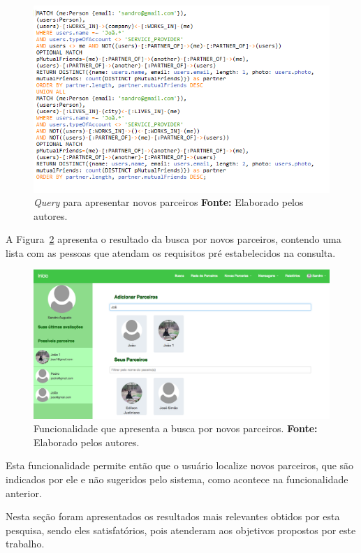 \begin{figure}[h!]
	\centerline{\includegraphics[scale=0.6]{./imagens/consulta-busca-novos-parceiros.png}}
	\caption[\textit{Query} para apresentar novos parceiros.]
	{\textit{Query} para apresentar novos parceiros \textbf{Fonte:} Elaborado pelos autores.}
	\label{fig:consulta_novos_parceiros}
\end{figure}

\par A Figura~\ref{fig:busca_novos_parceiros} apresenta o resultado da busca por novos parceiros, contendo uma lista com as pessoas que atendam os requisitos pré estabelecidos na consulta.

\begin{figure}[h!]
	\centerline{\includegraphics[scale=0.3]{./imagens/busca-novos-parceiros.png}}
	\caption[Funcionalidade que apresenta a busca por novos parceiros]
	{Funcionalidade que apresenta a busca por novos parceiros. \textbf{Fonte:} Elaborado pelos autores.}
	\label{fig:busca_novos_parceiros}
\end{figure}

\par  Esta funcionalidade permite então que o usuário localize novos parceiros, que são indicados por ele e não sugeridos pelo sistema, como acontece na funcionalidade anterior.

\par Nesta seção foram apresentados os resultados mais relevantes obtidos por esta pesquisa, sendo eles satisfatórios, pois atenderam aos objetivos propostos por este trabalho.
